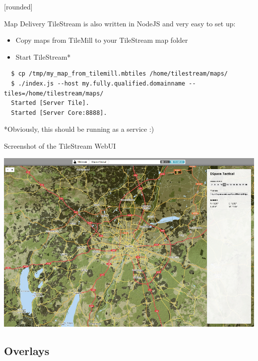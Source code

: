 \documentclass{beamer}
\newcommand\Fontvi{\fontsize{6}{7.2}\selectfont}
\begin{document}
[rounded]
\begin{frame}[fragile]{Map Delivery}
 TileStream is also written in NodeJS and very easy to set up:
 \linebreak
 \begin{itemize}
  \item Copy maps from TileMill to your TileStream map folder
  \item Start TileStream*
 \end{itemize}
\Fontvi
{}
\begin{block}{}
\begin{lstlisting}
  $ cp /tmp/my_map_from_tilemill.mbtiles /home/tilestream/maps/
  $ ./index.js --host my.fully.qualified.domainname --tiles=/home/tilestream/maps/
  Started [Server Tile].
  Started [Server Core:8888].
\end{lstlisting}
\end{block}
\tiny{*Obviously, this should be running as a service :)}
\end{frame}

\begin{frame}{Screenshot of the TileStream WebUI}
 \begin{center}
  \includegraphics[scale=0.3]{images/tilestream_ui}
 \end{center}
\end{frame}

\subsection{Overlays}
\end{document}
